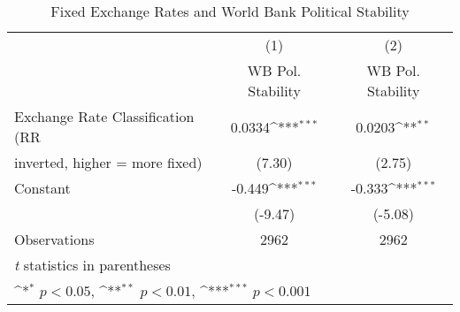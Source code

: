 \begin{table}[htbp]\centering
\def\sym#1{\ifmmode^{#1}\else\(^{#1}\)\fi}
\caption{Fixed Exchange Rates and World Bank Political Stability \label{WBratesalone}}
\begin{tabular}{l*{2}{c}}
\toprule
                                        &\multicolumn{1}{c}{(1)}&\multicolumn{1}{c}{(2)}\\
                                        &\multicolumn{1}{c}{WB Pol. Stability}&\multicolumn{1}{c}{WB Pol. Stability}\\
\midrule
Exchange Rate Classification (RR        &   0.0334\sym{***}&   0.0203\sym{**} \\
inverted, higher = more fixed)          &   (7.30)         &   (2.75)         \\
\addlinespace
Constant                                &   -0.449\sym{***}&   -0.333\sym{***}\\
                                        &  (-9.47)         &  (-5.08)         \\
\midrule
Observations                            &     2962         &     2962         \\
\bottomrule
\multicolumn{3}{l}{\footnotesize \textit{t} statistics in parentheses}\\
\multicolumn{3}{l}{\footnotesize \sym{*} \(p<0.05\), \sym{**} \(p<0.01\), \sym{***} \(p<0.001\)}\\
\end{tabular}
\end{table}
